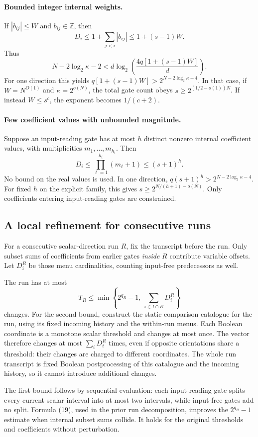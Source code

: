 \documentclass[11pt]{article}
\theoremstyle{definition}
\newcommand{\Z}{\mathbb Z}
\begin{document}
\paragraph{Bounded integer internal weights.}
If \(|b_{ij}|\le W\) and \(b_{ij}\in\Z\), then
\[
 D_i\le1+\sum_{j<i}|b_{ij}|\le1+(s-1)W.
\]
Thus
\[
 N-2\log_2\kappa-2
 <d\log_2\!\left(\frac{4q[1+(s-1)W]}d\right).            \tag{18}
\]
For one direction this yields \(q[1+(s-1)W]>2^{N-2\log_2\kappa-4}\).
In that case, if \(W=N^{O(1)}\) and \(\kappa=2^{o(N)}\), the total gate count obeys
\(s\ge2^{(1/2-o(1))N}\).
If instead \(W\le s^c\), the exponent becomes \(1/(c+2)\).

\paragraph{Few coefficient values with unbounded magnitude.}
Suppose an input-reading gate has at most \(h\) distinct nonzero internal coefficient values, with multiplicities \(m_1,\ldots,m_{h_i}\). Then
\[
 D_i\le\prod_{\ell=1}^{h_i}(m_\ell+1)\le(s+1)^h.
\]
No bound on the real values is used. In one direction,
\(q(s+1)^h>2^{N-2\log_2\kappa-4}\).
For fixed \(h\) on the explicit family, this gives
\(s\ge2^{N/(h+1)-o(N)}\).
Only coefficients entering input-reading gates are constrained.

\subsection{A local refinement for consecutive runs}
For a consecutive scalar-direction run \(R\), fix the transcript before the run. Only subset sums of coefficients from earlier gates \emph{inside} \(R\) contribute variable offsets. Let \(D_i^{R}\) be those menu cardinalities, counting input-free predecessors as well.

The run has at most
\[
 T_R\le
 \min\left\{2^{q_R}-1,\ \sum_{i\in I\cap R}D_i^R\right\}  \tag{19}
\]
changes. For the second bound, construct the static comparison catalogue for the run, using its fixed incoming history and the within-run menus. Each Boolean coordinate is a monotone scalar threshold and changes at most once. The vector therefore changes at most \(\sum_iD_i^R\) times, even if opposite orientations share a threshold: their changes are charged to different coordinates. The whole run transcript is fixed Boolean postprocessing of this catalogue and the incoming history, so it cannot introduce additional changes.

The first bound follows by sequential evaluation: each input-reading gate splits every current scalar interval into at most two intervals, while input-free gates add no split. Formula (19), used in the prior run decomposition, improves the \(2^{q_R}-1\) estimate when internal subset sums collide. It holds for the original thresholds and coefficients without perturbation.
\end{document}

